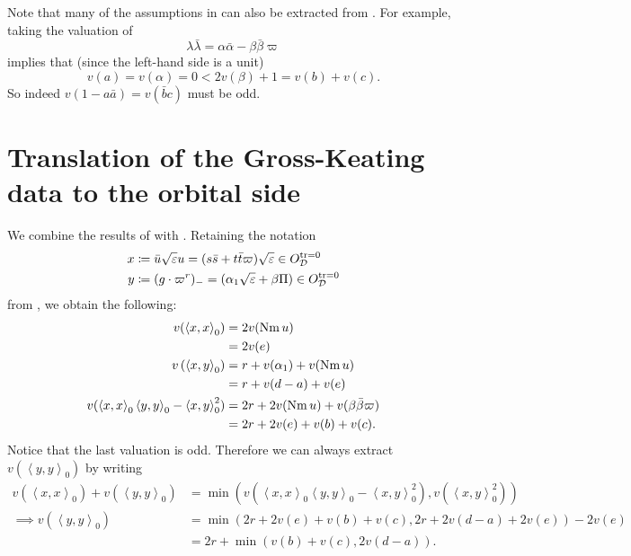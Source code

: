 \begin{remark}
  Note that many of the assumptions in 
  can also be extracted from .
  For example, taking the valuation of
  \[ \lambda \bar \lambda = \alpha \bar \alpha - \beta \bar \beta \varpi \]
  implies that (since the left-hand side is a unit)
  \[ v(a) = v(\alpha) = 0 <  2v(\beta) + 1 = v(b) + v(c). \]
  So indeed $v(1-a \bar a) = v(\bar bc)$ must be odd.
\end{remark}

\section{Translation of the Gross-Keating data to the orbital side}
We combine the results of  with .
Retaining the notation
\begin{align*}
  x &\coloneqq \bar u \sqrt{\varepsilon} u = (s \bar s + t \bar t \varpi) \sqrt{\varepsilon} \in O_\mathcal D^{\operatorname{tr} = 0} \\
  y &\coloneqq (g \cdot \varpi^r)_- = (\alpha_1\sqrt{\varepsilon} + \beta \Pi) \in O_\mathcal D^{\operatorname{tr} = 0}
\end{align*}
from , we obtain the following:
\begin{align*}
  v(\left\langle x,x \right\rangle _0)
    &= 2 v(\operatorname{Nm} u) \\
    &= 2v(e) \\
  v\left( \left\langle x,y \right\rangle _0 \right)
    &= r + v(\alpha_1) + v(\operatorname{Nm} u) \\
    &= r + v(d-a) + v(e) \\
  v(
    \left\langle x,x \right\rangle _0 \left\langle y,y \right\rangle _0
    - \left\langle x,y \right\rangle^2_0
  )
    &= 2r + 2 v(\operatorname{Nm} u) + v(\beta \bar\beta \varpi) \\
    &= 2r + 2v(e) + v(b) + v(c).
\end{align*}
Notice that the last valuation is odd.
Therefore we can always extract $v(\left\langle y,y \right\rangle _0)$ by writing
\begin{align*}
  v\left(\left\langle x,x \right\rangle _0\right) + v\left(\left\langle y,y \right\rangle _0\right)
  &= \min \left( v\left( \left\langle x,x \right\rangle _0 \left\langle y,y \right\rangle _0 - \left\langle x,y \right\rangle^2_0 \right),
    v(\left\langle x,y \right\rangle^2_0) \right) \\
  \implies  v\left(\left\langle y,y \right\rangle _0\right)
  &= \min(2r + 2v(e) + v(b) + v(c), 2r + 2v(d-a) + 2v(e)) - 2v(e) \\
  &= 2r + \min(v(b) + v(c), 2v(d-a)).
\end{align*}
